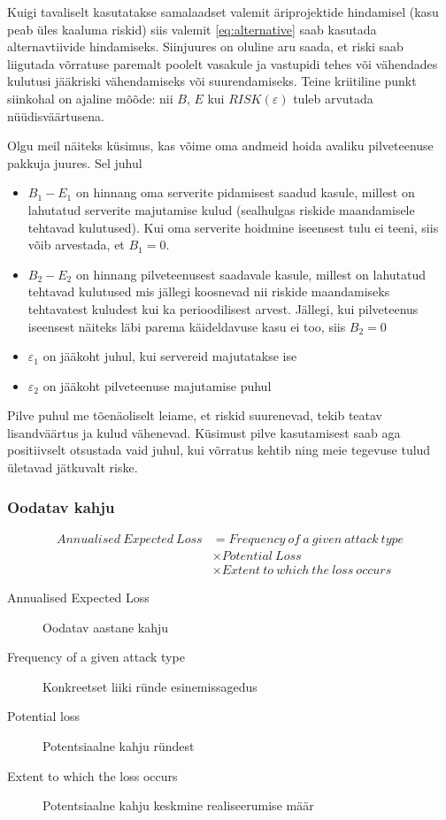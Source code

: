\documentclass{article}
\begin{document}
Kuigi tavaliselt kasutatakse samalaadset valemit äriprojektide hindamisel (kasu peab üles kaaluma riskid) siis valemit \ref{eq:alternative} saab kasutada alternavtiivide hindamiseks. Siinjuures on oluline aru saada, et riski saab liigutada võrratuse paremalt poolelt vasakule ja vastupidi tehes või vähendades kulutusi jääkriski vähendamiseks või suurendamiseks. Teine kriitiline punkt siinkohal on ajaline mõõde: nii $B$, $E$ kui $RISK(\varepsilon)$ tuleb arvutada nüüdisväärtusena.

Olgu meil näiteks küsimus, kas võime oma andmeid hoida avaliku pilveteenuse pakkuja juures. Sel juhul 
\begin{itemize}
	\item $B_1-E_1$ on hinnang oma serverite pidamisest saadud kasule, millest on lahutatud serverite majutamise kulud (sealhulgas riskide maandamisele tehtavad kulutused). Kui oma serverite hoidmine iseensest tulu ei teeni, siis võib arvestada, et $B_1=0$. 
	\item $B_2-E_2$ on hinnang pilveteenusest saadavale kasule, millest on lahutatud tehtavad kulutused mis jällegi koosnevad nii riskide maandamiseks tehtavatest kuludest kui ka perioodilisest arvest. Jällegi, kui pilveteenus iseensest näiteks läbi parema käideldavuse kasu ei too, siis $B_2=0$
	\item $\varepsilon_1$ on jääkoht juhul, kui servereid majutatakse ise
	\item $\varepsilon_2$ on jääkoht pilveteenuse majutamise puhul
\end{itemize}

Pilve puhul me tõenäoliselt leiame, et riskid suurenevad, tekib teatav lisandväärtus ja kulud vähenevad. Küsimust pilve kasutamisest saab aga positiivselt otsustada vaid juhul, kui võrratus kehtib ning meie tegevuse tulud ületavad jätkuvalt riske.


\subsubsection{Oodatav kahju} 

	\begin{align}
		Annualised\ Expected\ Loss &= Frequency\ of\ a\ given\ attack\ type \label{eq:loss}\\
		&\times Potential\ Loss \nonumber \\
		&\times Extent\ to\ which\ the\ loss\ occurs \nonumber
	\end{align}

\begin{description}
	\item[Annualised Expected Loss] Oodatav aastane kahju
	\item[Frequency of a given attack type] Konkreetset liiki ründe esinemissagedus
	\item[Potential loss] Potentsiaalne kahju ründest
	\item[Extent to which the loss occurs] Potentsiaalne kahju keskmine realiseerumise määr
\end{description}
\end{document}
